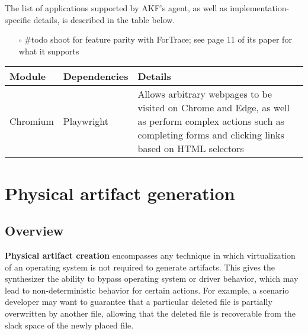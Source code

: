 The list of applications supported by AKF's agent, as well as
implementation-specific details, is described in the table below.

\begin{itemize}
\tightlist
\item[$\square$]
  \#todo shoot for feature parity with ForTrace; see page 11 of its
  paper for what it supports
\end{itemize}

\begin{longtable}[]{@{}
  >{\raggedright\arraybackslash}p{}
  >{\raggedright\arraybackslash}p{}
  >{\raggedright\arraybackslash}p{}@{}}
\toprule\noalign{}
\begin{minipage}[b]{\linewidth}\raggedright
Module
\end{minipage} & \begin{minipage}[b]{\linewidth}\raggedright
Dependencies
\end{minipage} & \begin{minipage}[b]{\linewidth}\raggedright
Details
\end{minipage} \\
\midrule\noalign{}
\endhead
\bottomrule\noalign{}
\endlastfoot
Chromium & Playwright \cite{MicrosoftPlaywrightpython2025} & Allows
arbitrary webpages to be visited on Chrome and Edge, as well as perform
complex actions such as completing forms and clicking links based on
HTML selectors \\
\end{longtable}

\section{Physical artifact
generation}\label{physical-artifact-generation}

\subsection{Overview}\label{overview-1}

\textbf{Physical artifact creation} encompasses any technique in which
virtualization of an operating system is not required to generate
artifacts. This gives the synthesizer the ability to bypass operating
system or driver behavior, which may lead to non-deterministic behavior
for certain actions. For example, a scenario developer may want to
guarantee that a particular deleted file is partially overwritten by
another file, allowing that the deleted file is recoverable from the
slack space of the newly placed file.

